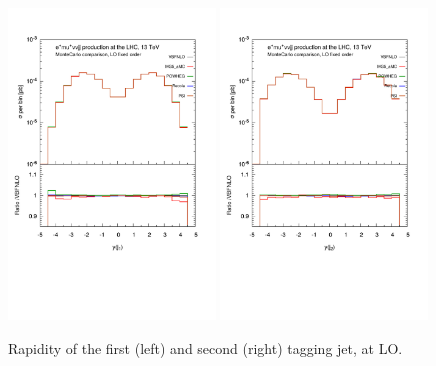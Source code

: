 \documentclass[a4paper,10pt]{report}
\begin{document}
\begin{figure}[h!]
   \centering
   \includegraphics[width=0.49\textwidth,angle=0,clip=true,trim={0.4cm 4.cm 0.6cm 1.5cm}]{figures/yj1_LO.pdf}
   \includegraphics[width=0.49\textwidth,angle=0,clip=true,trim={0.4cm 4.cm 0.6cm 1.5cm}]{figures/yj2_LO.pdf}
\caption{\label{fig:yj1-2LO}Rapidity of the first (left) and second (right) tagging jet, at LO.
}
\end{figure}
%
\end{document}
